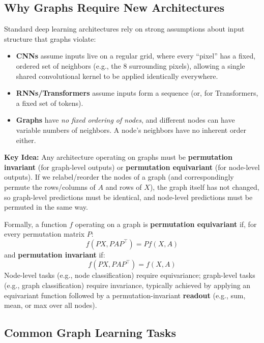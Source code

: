\documentclass[12pt,a4paper]{article}
\begin{document}
\subsection{Why Graphs Require New Architectures}

Standard deep learning architectures rely on strong assumptions about input structure that graphs violate:

\begin{itemize}
    \item \textbf{CNNs} assume inputs live on a regular grid, where every ``pixel'' has a fixed, ordered set of neighbors (e.g., the 8 surrounding pixels), allowing a single shared convolutional kernel to be applied identically everywhere.
    \item \textbf{RNNs/Transformers} assume inputs form a sequence (or, for Transformers, a fixed set of tokens).
    \item \textbf{Graphs} have \emph{no fixed ordering of nodes}, and different nodes can have variable numbers of neighbors. A node's neighbors have no inherent order either.
\end{itemize}

\textbf{Key Idea:} Any architecture operating on graphs must be \textbf{permutation invariant} (for graph-level outputs) or \textbf{permutation equivariant} (for node-level outputs). If we relabel/reorder the nodes of a graph (and correspondingly permute the rows/columns of $A$ and rows of $X$), the graph itself has not changed, so graph-level predictions must be identical, and node-level predictions must be permuted in the same way.

\begin{definition}
Formally, a function $f$ operating on a graph is \textbf{permutation equivariant} if, for every permutation matrix $P$:
\[
f(PX, PAP^\top) = P f(X, A)
\]
and \textbf{permutation invariant} if:
\[
f(PX, PAP^\top) = f(X, A)
\]
Node-level tasks (e.g., node classification) require equivariance; graph-level tasks (e.g., graph classification) require invariance, typically achieved by applying an equivariant function followed by a permutation-invariant \textbf{readout} (e.g., sum, mean, or max over all nodes).
\end{definition}

\subsection{Common Graph Learning Tasks}
\end{document}
